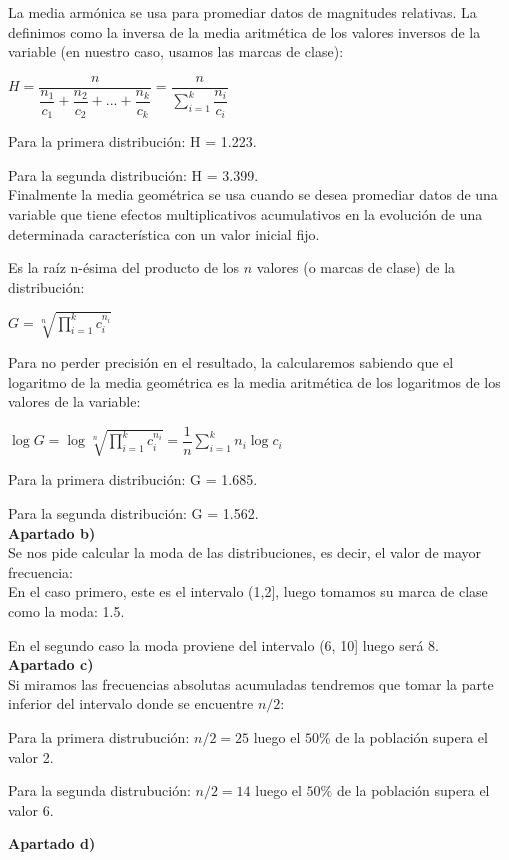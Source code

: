 La media armónica se usa para promediar datos de magnitudes relativas. La definimos como la inversa de la media aritmética de los valores inversos de la variable (en nuestro caso, usamos las marcas de clase):
\begin{center}
	$H = \dfrac{n}{\dfrac{n_1}{c_1}+\dfrac{n_2}{c_2}+ ...+\dfrac{n_k}{c_k}} = \dfrac{n}{\sum_{i=1}^{k}\dfrac{n_i}{c_i}}$
\end{center}

Para la primera distribución: H = 1.223.

Para la segunda distribución: H = 3.399.  \\


Finalmente la media geométrica se usa cuando se desea promediar datos de una variable que tiene efectos
multiplicativos acumulativos en la evolución de una determinada característica con un
valor inicial fijo.

Es la raíz n-ésima del producto de los $n$ valores (o marcas de clase) de la distribución:

\begin{center}
	$G = \sqrt[n]{\prod_{i=1}^{k}c_i^{n_i}}$
\end{center}

Para no perder precisión en el resultado, la calcularemos sabiendo que el logaritmo de la media geométrica es la media aritmética de los logaritmos de los valores de la variable:

\begin{center}
	$\log G = \log \sqrt[n]{\prod_{i=1}^{k}c_i^{n_i}} = \dfrac{1}{n}\sum_{i=1}^{k}n_i \log c_i$
\end{center}

Para la primera distribución: G = 1.685.

Para la segunda distribución: G = 1.562.  \\


\textbf{Apartado b)}\\

Se nos pide calcular la moda de las distribuciones, es decir, el valor  de mayor frecuencia: \\

En el caso primero, este es el intervalo (1,2], luego tomamos su marca de clase como la moda: 1.5.

En el segundo caso la moda proviene del intervalo (6, 10] luego será 8.\\

\textbf{Apartado c)}\\

Si miramos las frecuencias absolutas acumuladas tendremos que tomar la parte inferior del intervalo donde se encuentre $n/2$:

Para la primera distrubución: $n/2 = 25$ luego el $50\%$ de la población supera el valor 2.

Para la segunda distrubución: $n/2 = 14$ luego el $50\%$ de la población supera el valor 6.

\textbf{Apartado d)}\\